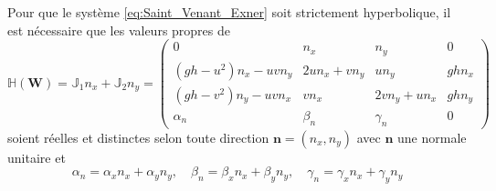 \documentclass[11pt, a4paper, oneside]{report}
\begin{document}
Pour que le système \eqref{eq:Saint_Venant_Exner} soit strictement hyperbolique, il est nécessaire que les valeurs propres de
\begin{equation}
    \mathbb{H}(\bm{W}) = \mathbb{J}_1 n_x + \mathbb{J}_2 n_y = \begin{pmatrix}
        0 & n_x & n_y & 0 \\
        (gh - u^2) n_x - uv n_y & 2u n_x + v n_y & u n_y & gh n_x \\
        (gh - v^2) n_y - uv n_x & v n_x & 2v n_y + u n_x & gh n_y \\
        \alpha_n & \beta_n & \gamma_n & 0
    \end{pmatrix}
\end{equation}
soient réelles et distinctes selon toute direction $\bm{n} = (n_x, n_y)$ avec $\bm{n}$ une normale unitaire et
\begin{equation}
    \alpha_n = \alpha_x n_x + \alpha_y n_y, \quad \beta_n = \beta_x n_x + \beta_y n_y, \quad \gamma_n = \gamma_x n_x + \gamma_y n_y
\end{equation}
\end{document}
